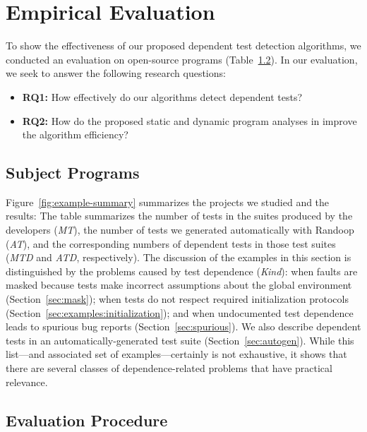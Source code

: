 \section{Empirical Evaluation}
\label{sec:examples}

To show the effectiveness of our proposed
dependent test detection algorithms, we conducted
an evaluation on  open-source programs (Table~\ref{}).
In our evaluation, we seek to answer the following research questions:

\begin{itemize}
\item \textbf{RQ1:} How effectively do our algorithms detect
dependent tests?
\item \textbf{RQ2:} How do the proposed static and dynamic program analyses
in  improve the algorithm efficiency?
\end{itemize}

\subsection{Subject Programs}



Figure~\ref{fig:example-summary}
summarizes the projects we studied and the results: The table
summarizes the number of tests in the suites produced by the
developers (\emph{MT}), the number of tests we generated automatically
with Randoop (\emph{AT}), and the corresponding numbers of dependent
tests in those test suites (\emph{MTD} and \emph{ATD}, respectively). 
The discussion of the examples in this section is distinguished by
the problems caused by test dependence (\emph{Kind}): when faults are masked because
tests make incorrect assumptions about the global environment (Section~\ref{sec:mask}); 
when tests do not
respect required initialization protocols (Section~\ref{sec:examples:initialization}); and when
undocumented test dependence leads to spurious bug reports (Section~\ref{sec:spurious}).
We also describe dependent tests in an automatically-generated test
suite (Section~\ref{sec:autogen}).
While this list---and associated set of examples---certainly is not exhaustive, it shows that there are
several classes of dependence-related problems that have practical
relevance.


\subsection{Evaluation Procedure}

